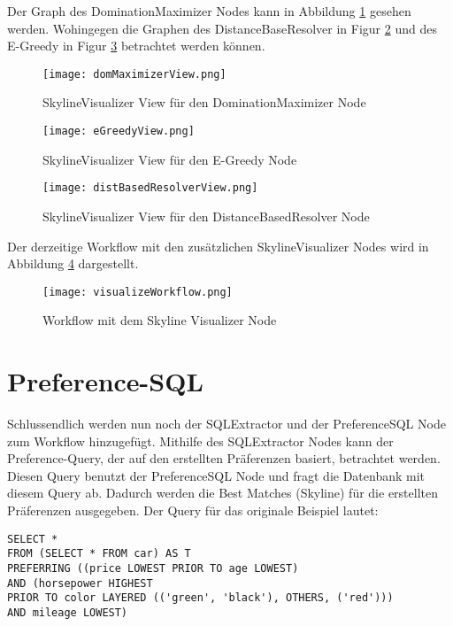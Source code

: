 Der Graph des DominationMaximizer Nodes kann in Abbildung \ref{img:domMaximizerView} gesehen werden. Wohingegen die Graphen des DistanceBaseResolver in Figur \ref{img:eGreedyView} und des E-Greedy in Figur \ref{img:distBasedResolverView} betrachtet werden können. 

\begin{figure}[H]
	\centering
	\texttt{[image: domMaximizerView.png]}
	\caption{SkylineVisualizer View für den DominationMaximizer Node}
	\label{img:domMaximizerView}
	
\end{figure} 
	\begin{figure}[H]
	\centering
	\texttt{[image: eGreedyView.png]}
	\caption{SkylineVisualizer View für den E-Greedy Node}
	\label{img:eGreedyView}
\end{figure} 

\begin{figure}[H]
	\centering
	\texttt{[image: distBasedResolverView.png]}
	\caption{SkylineVisualizer View für den DistanceBasedResolver Node}
	\label{img:distBasedResolverView}
\end{figure} 

Der derzeitige Workflow mit den zusätzlichen SkylineVisualizer Nodes wird in Abbildung \ref{img:visualizeWorkflow} dargestellt.

\begin{figure}[H]
	\centering
	\texttt{[image: visualizeWorkflow.png]}
	\caption{Workflow mit dem Skyline Visualizer Node}
	\label{img:visualizeWorkflow}
\end{figure} 

\section{Preference-SQL}
\label{ch:Evaluierung:sec:prefSQL}
Schlussendlich werden nun noch der SQLExtractor und der PreferenceSQL Node zum Workflow hinzugefügt. Mithilfe des SQLExtractor Nodes kann der Preference-Query, der auf den erstellten Präferenzen basiert, betrachtet werden. Diesen Query benutzt der PreferenceSQL Node und fragt die Datenbank mit diesem Query ab. Dadurch werden die Best Matches (Skyline) für die erstellten Präferenzen ausgegeben. Der Query für das originale Beispiel lautet:
 
\begin{verbatim}
SELECT * 
FROM (SELECT * FROM car) AS T 
PREFERRING ((price LOWEST PRIOR TO age LOWEST) 
AND (horsepower HIGHEST 
PRIOR TO color LAYERED (('green', 'black'), OTHERS, ('red')))
AND mileage LOWEST)
\end{verbatim}

